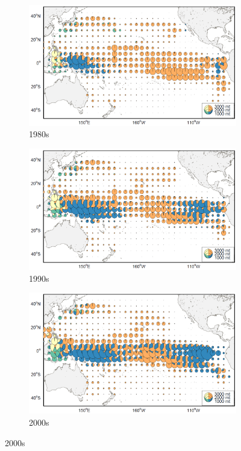 \captionsetup[subfigure] {labelformat=empty,labelfont=bf,textfont=normalfont,singlelinecheck=on}
\begin{figure}[H]
\centering
\begin{subfigure}[b]{0.485\textwidth}
\caption{1980s}
\includegraphics[width=1\textwidth]{chapter4/figs/bet_catch_2d_80s}
\end{subfigure}
\begin{subfigure}[b]{0.485\textwidth}
\caption{1990s}
\includegraphics[width=1\textwidth]{chapter4/figs/bet_catch_2d_90s}
\end{subfigure}
\begin{subfigure}[b]{0.485\textwidth}
\caption{2000s}
\includegraphics[width=1\textwidth]{chapter4/figs/bet_catch_2d_00s}

\end{subfigure}
\end{figure}
